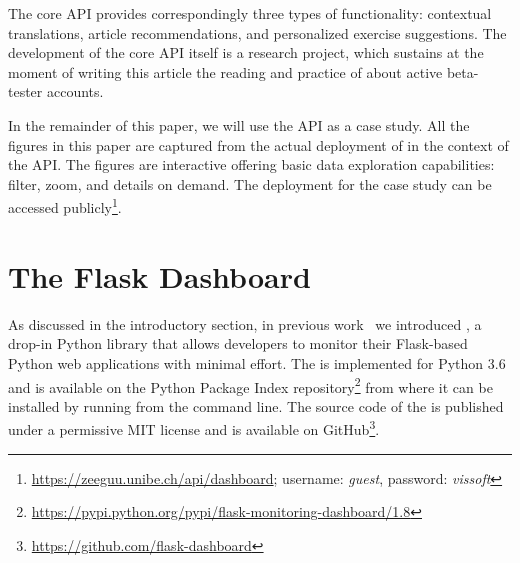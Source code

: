 \documentclass{sig-alternate-05-2015}
\begin{document}
  The core API provides correspondingly three types of functionality: contextual translations, article recommendations, and personalized exercise suggestions. The development of the core API itself is a research project, which sustains at the moment of writing this article the reading and practice of about \activeUserCount active beta-tester accounts. 

  In the remainder of this paper, we will use the \zee API as a case study. All the figures in this paper are captured from the actual deployment of \tool in the context of the \zee API. The figures are interactive offering basic data exploration capabilities: filter, zoom, and details on demand\cite{Shne99a}. The \tool deployment for the case study can be accessed publicly\footnote{\url{https://zeeguu.unibe.ch/api/dashboard}; username: {\em guest}, password: {\em vissoft}}. 




\section{The Flask Dashboard}
\label{sec:tool}


  As discussed in the introductory section, in previous work~\cite{vogel2017low} we introduced \tool, a drop-in Python library that allows developers to monitor their Flask-based Python web applications with minimal effort.
%
  The \tool is implemented for Python 3.6 and is available on the Python Package Index repository\footnote{\url{https://pypi.python.org/pypi/flask-monitoring-dashboard/1.8}} from where it can be installed by running \install from the command line. 
%  
  The source code of the \tool is published under a permissive MIT license and is available on GitHub\footnote{\url{https://github.com/flask-dashboard}}.
  
\end{document}
